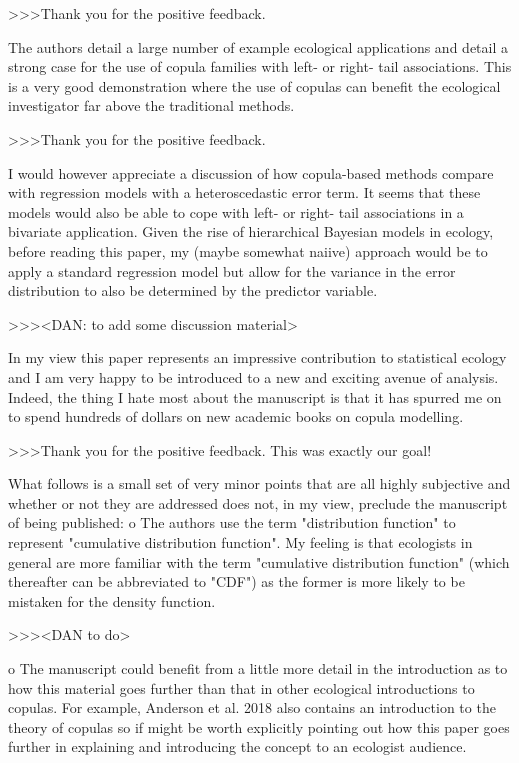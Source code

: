 >>>Thank you for the positive feedback.

The authors detail a large number of example ecological applications and detail a strong case for the use of copula families with left- or right- tail associations.  This is a very good demonstration where the use of copulas can benefit the ecological investigator far above the traditional methods.  

>>>Thank you for the positive feedback.

I would however appreciate a discussion of how copula-based methods compare with regression models with a heteroscedastic error term.  It seems that these models would also be able to cope with left- or right- tail associations in a bivariate application.  Given the rise of hierarchical Bayesian models in ecology, before reading this paper, my (maybe somewhat naiive) approach would be to apply a standard regression model but allow for the variance in the error distribution to also be determined by the predictor variable.

>>><DAN: to add some discussion material>

In my view this paper represents an impressive contribution to statistical ecology and I am very happy to be introduced to a new and exciting avenue of analysis.  Indeed, the thing I hate most about the manuscript is that it has spurred me on to spend hundreds of dollars on new academic books on copula modelling.

>>>Thank you for the positive feedback. This was exactly our goal!

What follows is a small set of very minor points that are all highly subjective and whether or not they are addressed does not, in my view, preclude the manuscript of being published:
o    The authors use the term "distribution function" to represent "cumulative distribution function".  My feeling is that ecologists in general are more familiar with the term "cumulative distribution function" (which thereafter can be abbreviated to "CDF") as the former is more likely to be mistaken for the density function.

>>><DAN to do>

o    The manuscript could benefit from a little more detail in the introduction as to how this material goes further than that in other ecological introductions to copulas.  For example, Anderson et al. 2018 also contains an introduction to the theory of copulas so if might be worth explicitly pointing out how this paper goes further in explaining and introducing the concept to an ecologist audience.

